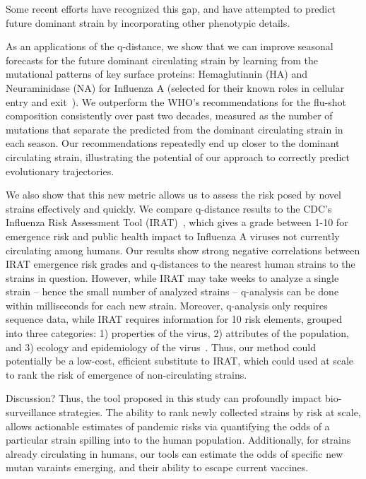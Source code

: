 \documentclass[onecolumn, compsoc,10pt]{IEEEtran}
\begin{document}
Some recent efforts have recognized this gap, and have attempted to predict future dominant strain by incorporating other phenotypic details. 

As an applications of the q-distance, we show that we can improve seasonal forecasts for the future dominant circulating strain by learning from the mutational patterns of key surface proteins: Hemaglutinnin (HA) and Neuraminidase (NA) for Influenza A (selected for their known roles in cellular entry and exit~\cite{gamblin2010influenza}). We outperform the WHO's recommendations for the flu-shot composition consistently over past two decades, measured as the number of mutations that separate the predicted from the dominant circulating strain in each season. Our recommendations repeatedly end up closer to the dominant circulating strain, illustrating the potential of our approach to correctly predict evolutionary trajectories. 

We also show that this new metric allows us to  assess the risk posed by novel strains  effectively and quickly. We compare q-distance results to the CDC's Influenza Risk Assessment Tool (IRAT)~\cite{Influenz24:online}, which gives a grade between 1-10 for emergence risk and public health impact to Influenza A viruses not currently circulating among humans. Our results show strong negative correlations between IRAT emergence risk grades and q-distances to the nearest human strains to the strains in question. However, while IRAT may take weeks to analyze a single strain -- hence the small number of analyzed strains -- q-analysis can be done within milliseconds for each new strain. Moreover, q-analysis only requires sequence data, while IRAT requires information for 10 risk elements, grouped into three categories: 1) properties of the virus, 2) attributes of the population, and 3) ecology and epidemiology of the virus~\cite{Influenz24:online}. Thus, our method could potentially be a low-cost, efficient substitute to IRAT, which could used at scale to rank the risk of emergence of non-circulating strains.

{\color{Red1} Discussion? 
Thus, the tool proposed in this study  can  profoundly impact  bio-surveillance strategies. The ability to rank newly collected strains by risk at scale, allows actionable estimates of  pandemic risks via  quantifying the odds of a particular strain spilling into to the human population. Additionally,  for strains already circulating in humans, our tools can estimate the odds  of specific  new mutan varaints emerging, and their ability to  escape current vaccines. %
}
\end{document}
